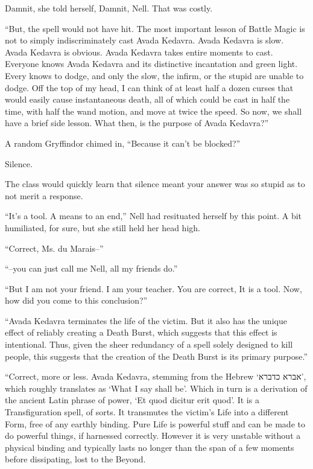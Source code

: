 Damnit, she told herself, Damnit, Nell. That was costly.

“But, the spell would not have hit. The most important lesson of Battle Magic is not to simply indiscriminately cast Avada Kedavra. Avada Kedavra is slow. Avada Kedavra is obvious. Avada Kedavra takes entire moments to cast. Everyone knows Avada Kedavra and its distinctive incantation and green light. Every knows to dodge, and only the slow, the infirm, or the stupid are unable to dodge. Off the top of my head, I can think of at least half a dozen curses that would easily cause instantaneous death, all of which could be cast in half the time, with half the wand motion, and move at twice the speed. So now, we shall have a brief side lesson. What then, is the purpose of Avada Kedavra?”

A random Gryffindor chimed in, “Because it can’t be blocked?”

Silence.

The class would quickly learn that silence meant your answer was so stupid as to not merit a response.

“It’s a tool. A means to an end,” Nell had resituated herself by this point. A bit humiliated, for sure, but she still held her head high.

“Correct, Ms. du Marais–”

“–you can just call me Nell, all my friends do.”

“But I am not your friend. I am your teacher. You are correct, It is a tool. Now, how did you come to this conclusion?”

“Avada Kedavra terminates the life of the victim. But it also has the unique effect of reliably creating a Death Burst, which suggests that this effect is intentional. Thus, given the sheer redundancy of a spell solely designed to kill people, this suggests that the creation of the Death Burst is its primary purpose.”

“Correct, more or less. Avada Kedavra, stemming from the Hebrew ‘אברא כדברא’, which roughly translates as ‘What I say shall be’. Which in turn is a derivation of the ancient Latin phrase of power, ‘Et quod dicitur erit quod’. It is a Transfiguration spell, of sorts. It transmutes the victim’s Life into a different Form, free of any earthly binding. Pure Life is powerful stuff and can be made to do powerful things, if harnessed correctly. However it is very unstable without a physical binding and typically lasts no longer than the span of a few moments before dissipating, lost to the Beyond.

